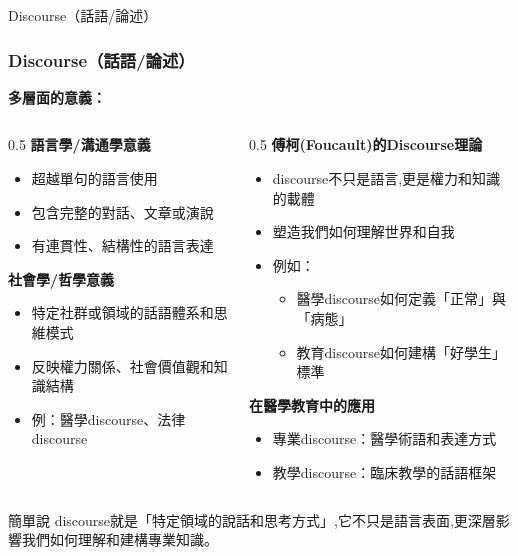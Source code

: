 \documentclass[aspectratio=169]{beamer}
\begin{document}
\begin{frame}{Discourse（話語/論述）}
\frametitle{Discourse（話語/論述）}

\textbf{多層面的意義：}

\begin{columns}
\begin{column}{0.5\textwidth}
\textbf{語言學/溝通學意義}
\begin{itemize}
    \item 超越單句的語言使用
    \item 包含完整的對話、文章或演說
    \item 有連貫性、結構性的語言表達
\end{itemize}

\vspace{0.3cm}

\textbf{社會學/哲學意義}
\begin{itemize}
    \item 特定社群或領域的話語體系和思維模式
    \item 反映權力關係、社會價值觀和知識結構
    \item 例：醫學discourse、法律discourse
\end{itemize}
\end{column}

\begin{column}{0.5\textwidth}
\textbf{傅柯(Foucault)的Discourse理論}
\begin{itemize}
    \item discourse不只是語言,更是權力和知識的載體
    \item 塑造我們如何理解世界和自我
    \item 例如：
    \begin{itemize}
        \item 醫學discourse如何定義「正常」與「病態」
        \item 教育discourse如何建構「好學生」標準
    \end{itemize}
\end{itemize}

\vspace{0.3cm}

\textbf{在醫學教育中的應用}
\begin{itemize}
    \item 專業discourse：醫學術語和表達方式
    \item 教學discourse：臨床教學的話語框架
\end{itemize}
\end{column}
\end{columns}

\vspace{0.3cm}

\begin{block}{簡單說}
discourse就是「特定領域的說話和思考方式」,它不只是語言表面,更深層影響我們如何理解和建構專業知識。
\end{block}
\end{frame}
\end{document}
